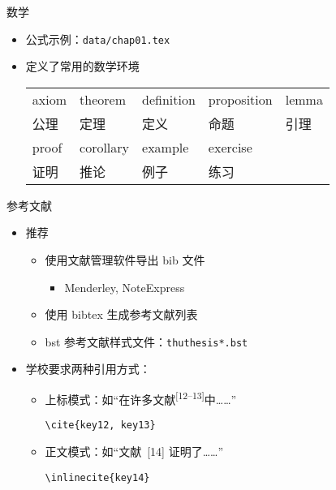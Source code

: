 \begin{frame}{数学}
  \begin{itemize}
    \item 公式示例：\nolinkurl{data/chap01.tex}
    \item \ThuThesis{} 定义了常用的数学环境
      \begin{table}[h]
        \centering
    \begin{tabular}{lllll}\hline
axiom & theorem & definition & proposition & lemma \\
公理 & 定理 & 定义 & 命题 & 引理 \\\hline
proof & corollary & example & exercise &\\
证明 & 推论 & 例子& 练习 &\\\hline
    \end{tabular}
      \end{table}
  \end{itemize}
\end{frame}

\begin{frame}[fragile]{参考文献}
  \begin{itemize}
    \item 推荐 \BibTeX
      \begin{itemize}
        \item 使用文献管理软件导出 bib 文件
          \begin{itemize}
            \item Menderley, NoteExpress
          \end{itemize}
        \item 使用 bibtex 生成参考文献列表
        \item bst 参考文献样式文件：\texttt{thuthesis*.bst}
      \end{itemize}
    \item 学校要求两种引用方式：
      \begin{itemize}
        \item 上标模式：如``在许多文献\textsuperscript{[12--13]}中……''
        \begin{lstlisting}[basicstyle=\ttfamily]
  \cite{key12, key13}
        \end{lstlisting}
      \item 正文模式：如``文献~[14] 证明了……''
        \begin{lstlisting}[basicstyle=\ttfamily]
  \inlinecite{key14}
        \end{lstlisting}
      \end{itemize}
    \end{itemize}
\end{frame}

